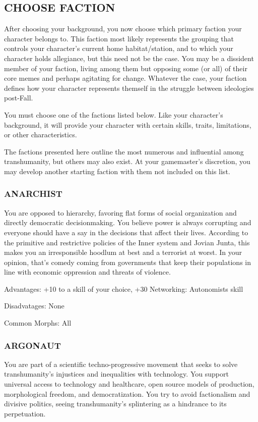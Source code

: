 \subsection{CHOOSE FACTION}
After choosing your background, you now choose
which primary faction your character belongs to.
This faction most likely represents the grouping that
controls your character’s current home habitat/station,
and to which your character holds allegiance, but this
need not be the case. You may be a dissident member
of your faction, living among them but opposing some
(or all) of their core memes and perhaps agitating for
change. Whatever the case, your faction defines how
your character represents themself in the struggle between ideologies post-Fall.

You must choose one of the factions listed below.
Like your character’s background, it will provide your
character with certain skills, traits, limitations, or
other characteristics.

The factions presented here outline the most numerous and influential among transhumanity, but others
may also exist. At your gamemaster’s discretion, you
may develop another starting faction with them not
included on this list.

\subsubsection{ANARCHIST}
You are opposed to hierarchy, favoring flat forms of
social organization and directly democratic decisionmaking. You believe power is always corrupting and
everyone should have a say in the decisions that affect
their lives. According to the primitive and restrictive
policies of the Inner system and Jovian Junta, this
makes you an irresponsible hoodlum at best and a terrorist at worst. In your opinion, that’s comedy coming
from governments that keep their populations in line
with economic oppression and threats of violence.

 Advantages: +10 to a skill of your choice, +30 Networking: Autonomists skill

 Disadvatages: None

 Common Morphs: All

\subsubsection{ARGONAUT}
You are part of a scientific techno-progressive movement that seeks to solve transhumanity’s injustices and
inequalities with technology. You support universal
access to technology and healthcare, open source
models of production, morphological freedom, and
democratization. You try to avoid factionalism and
divisive politics, seeing transhumanity’s splintering as
a hindrance to its perpetuation.

